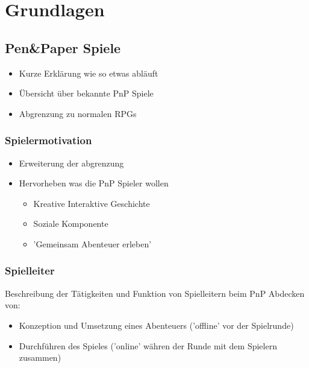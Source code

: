 \chapter{Grundlagen}
\label{background}




\section{Pen\&Paper Spiele}
\label{sec:PenPaperSpiele}

\begin{itemize}
	\item Kurze Erklärung wie so etwas abläuft
	\item Übersicht über bekannte PnP Spiele
	\item Abgrenzung zu normalen RPGs
\end{itemize}


\subsection{Spielermotivation}
\label{sec:Spielermotivation}

\begin{itemize}
	\item Erweiterung der abgrenzung
	\item Hervorheben was die PnP Spieler wollen
	
	\begin{itemize}
		\item Kreative Interaktive Geschichte
		\item Soziale Komponente
		\item 'Gemeinsam Abenteuer erleben'
	\end{itemize}
	
\end{itemize}

\subsection{Spielleiter}
\label{sec:Spielleiter}
Beschreibung der Tätigkeiten und Funktion von Spielleitern beim PnP\newline
Abdecken von:
\begin{itemize}
	\item Konzeption und Umsetzung eines Abenteuers ('offline' vor der Spielrunde)
	\item Durchführen des Spieles ('online' währen der Runde mit dem Spielern zusammen)
\end{itemize}


